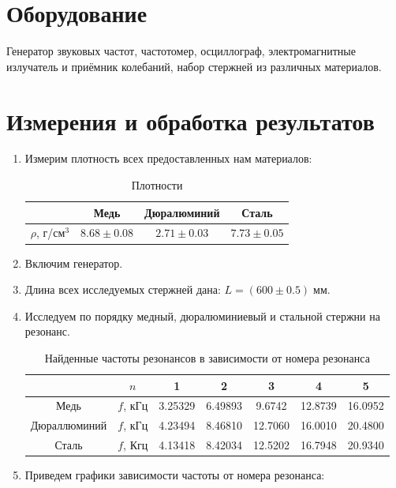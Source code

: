 \documentclass[a4, 12pt]{article}
\begin{document}
\section{Оборудование}
Генератор звуковых частот, частотомер, осциллограф,
электромагнитные излучатель и приёмник колебаний, набор стержней из различных материалов.

\section{Измерения и обработка результатов}
\begin{enumerate}
    \item Измерим плотность всех предоставленных нам материалов:
    \begin{table}[H]
        \centering
        \caption{Плотности}
        \begin{tabular}{c|c|c|c|}
            \hline
                            & Медь          & Дюралюминий      & Сталь \\
            \hline
             $\rho$, г/см$^3$ & $8.68\pm0.08$ & $2.71\pm0.03$ & $7.73\pm0.05$ \\
            \hline
        \end{tabular}
    \end{table}
    \item Включим генератор.
    \item Длина всех исследуемых стержней дана: $L = (600\pm0.5)\;\text{мм}$.
    \item Исследуем по порядку медный, дюралюминиевый и стальной стержни на
    резонанс.
    \begin{table}[H]
        \centering
        \caption{Найденные частоты резонансов в зависимости от номера резонанса}
        \begin{tabular}{|c|c|c|c|c|c|c|}
        \hline
                     & $n$      & 1       & 2       & 3       & 4       & 5       \\ \hline
        Медь         & $f$, кГц & 3.25329 & 6.49893 & 9.6742  & 12.8739 & 16.0952 \\ \hline
        Дюраллюминий & $f$, кГц & 4.23494 & 8.46810 & 12.7060 & 16.0010 & 20.4800 \\ \hline
        Сталь        & $f$, Кгц & 4.13418 & 8.42034 & 12.5202 & 16.7948 & 20.9340 \\ \hline
    \end{tabular}
    \end{table}
    \item Приведем графики зависимости частоты от номера резонанса:

\end{enumerate}
\end{document}
